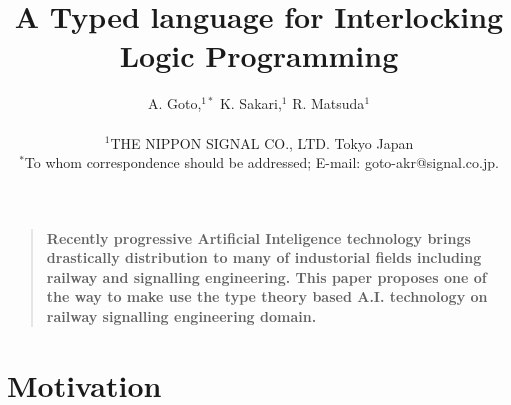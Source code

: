 \documentclass[12pt]{article}
\title{A Typed language for Interlocking Logic Programming}
\author
{A. Goto,$^{1\ast}$ K. Sakari,$^{1}$ R. Matsuda$^{1}$\\
\\
\normalsize{$^{1}$THE NIPPON SIGNAL CO., LTD. Tokyo Japan}\\
\normalsize{$^\ast$To whom correspondence should be addressed;
  E-mail: goto-akr@signal.co.jp.}
}
\date{}
\newenvironment{sciabstract}{%
\begin{quote} \bf}
{\end{quote}}
\begin{document}
 


\baselineskip24pt


\maketitle 




\begin{sciabstract}
  Recently progressive Artificial Inteligence technology brings drastically
  distribution to many of industorial fields including railway and
  signalling engineering. This paper proposes one of the way to
  make use the type theory based A.I. technology on railway signalling
  engineering domain.
\end{sciabstract}




\section*{Motivation}
\end{document}
